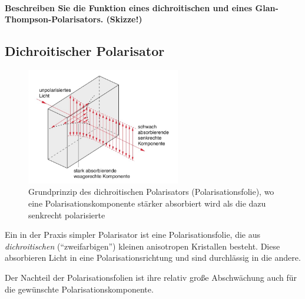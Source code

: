 \documentclass[a4paper, 11pt, ngerman, parskip=half-]{scrartcl}
\begin{document}
\paragraph{Beschreiben Sie die Funktion eines dichroitischen und eines Glan-Thompson-Polarisators. (Skizze!)}
%
\subsection*{Dichroitischer Polarisator}
%
\begin{figure}[!h]
    \centering
    \begin{samepage}
        \includegraphics[width=0.6\textwidth]{image/15/dichroitische_folie.jpg}
        \caption{Grundprinzip des dichroitischen Polarisators (Polarisationsfolie), wo eine Polarisationskomponente stärker absorbiert wird als die dazu senkrecht polarisierte}
        \label{fig:dichroitischer_polarisator}
    \end{samepage}
\end{figure}
%
Ein in der Praxis simpler Polarisator ist eine Polarisationsfolie, die aus \textit{dichroitischen} (\enquote{zweifarbigen}) kleinen anisotropen Kristallen besteht. Diese absorbieren Licht in eine Polarisationsrichtung und sind durchlässig in die andere.

Der Nachteil der Polarisationsfolien ist ihre relativ große Abschwächung auch für die gewünschte Polarisationskomponente.
%
\end{document}
